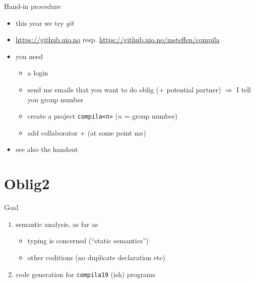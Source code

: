 \documentclass{beamer}
\begin{document}
\begin{frame}[label={sec:org0cfe333},fragile]{Hand-in procedure}
 \begin{itemize}
\item this year we try \emph{git}

\item \url{https://github.uio.no} resp. \url{https://github.uio.no/msteffen/compila}

\item you need

\begin{itemize}
\item a login
\item send me emails that you want to do oblig (+ potential partner)
\(\Rightarrow\) I tell you group number
\item create a project \texttt{compila<n>} (\(n\) = group number)
\item add collaborator + (at some point me)
\end{itemize}
\end{itemize}


\begin{itemize}
\item see also the handout
\end{itemize}
\end{frame}





\chapter{Oblig2}
\label{sec:orgf8c0c0d}


\begin{frame}[label={sec:orge321c1b},fragile]{Goal}
 \begin{enumerate}
\item \alert{semantic  analysis}, as far as 
\begin{itemize}
\item \alert{typing} is concerned (``static semantics'')
\item other coditions (no duplicate declaration etc)
\end{itemize}

\item \alert{code generation} for \texttt{compila19} (ish) programs
\end{enumerate}
\end{frame}
\end{document}
